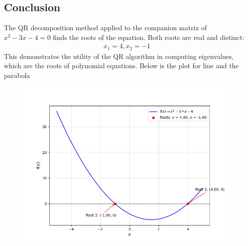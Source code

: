 \documentclass[journal]{IEEEtran}
\begin{document}
\subsection*{Conclusion}
The QR decomposition method applied to the companion matrix of $x^2-3x-4= 0$ finds the roots of the equation. Both roots are real and distinct:
\begin{align}
    x_1 =4,x_2=-1
\end{align}
This demonstrates the utility of the QR algorithm in computing eigenvalues, which are the roots of polynomial equations.
Below is the plot for line and the parabola
\begin{figure}[h!]
	\centering
	\includegraphics[width=1\columnwidth]{figs/fig.png}
	\label{stemplot}
\end{figure}
\end{document}
